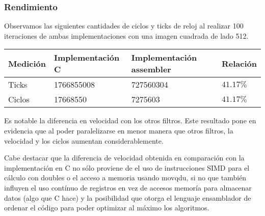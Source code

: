 \subsubsection{Rendimiento}
Observamos las siguientes cantidades de ciclos y ticks de reloj al realizar 100 iteraciones de ambas implementaciones con una imagen cuadrada de lado 512.
\begin{center}
    \begin{tabular}{|l|l|l|l|}
        \hline
        Medición & Implementación C & Implementación assembler & Relación \\
        \hline
        Ticks    & 1766855008      & 727560304               & $41.17\%$ \\
        Ciclos   & 17668550       & 7275603                & $41.17\%$ \\
        \hline
    \end{tabular}
\end{center}

Es notable la diferencia en velocidad con los otros filtros. Este resultado pone en evidencia que al poder paralelizarse en menor manera que otros filtros, la velocidad y los ciclos aumentan considerablemente.

Cabe destacar que la diferencia de velocidad obtenida en comparación con la implementación en C no sólo proviene de el uso de instrucciones SIMD para el cálculo con doubles o el acceso a memoria usando movqdu, si no que también influyen el uso contínuo de registros en vez de accesos memoría para almacenar datos (algo que C hace) y la posibilidad que otorga el lenguaje ensamblador de ordenar el código para poder optimizar al máximo los algoritmos.